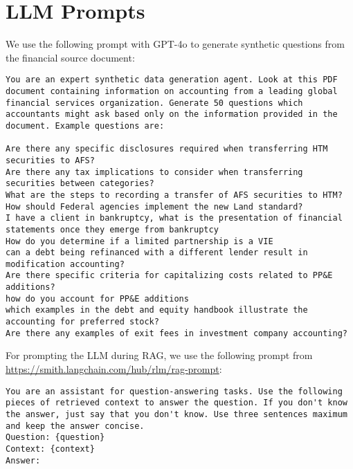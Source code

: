 \section{LLM Prompts}
\label{sec:prompts}
We use the following prompt with GPT-4o to generate synthetic questions from the financial source document:
\begin{lstlisting}
You are an expert synthetic data generation agent. Look at this PDF document containing information on accounting from a leading global financial services organization. Generate 50 questions which accountants might ask based only on the information provided in the document. Example questions are:

Are there any specific disclosures required when transferring HTM securities to AFS?
Are there any tax implications to consider when transferring securities between categories?
What are the steps to recording a transfer of AFS securities to HTM?
How should Federal agencies implement the new Land standard? 
I have a client in bankruptcy, what is the presentation of financial statements once they emerge from bankruptcy
How do you determine if a limited partnership is a VIE
can a debt being refinanced with a different lender result in modification accounting?
Are there specific criteria for capitalizing costs related to PP&E additions?
how do you account for PP&E additions
which examples in the debt and equity handbook illustrate the accounting for preferred stock?
Are there any examples of exit fees in investment company accounting?
\end{lstlisting}

For prompting the LLM during RAG, we use the following prompt from \url{https://smith.langchain.com/hub/rlm/rag-prompt}:

\begin{lstlisting}
You are an assistant for question-answering tasks. Use the following pieces of retrieved context to answer the question. If you don't know the answer, just say that you don't know. Use three sentences maximum and keep the answer concise.
Question: {question} 
Context: {context} 
Answer:
\end{lstlisting}